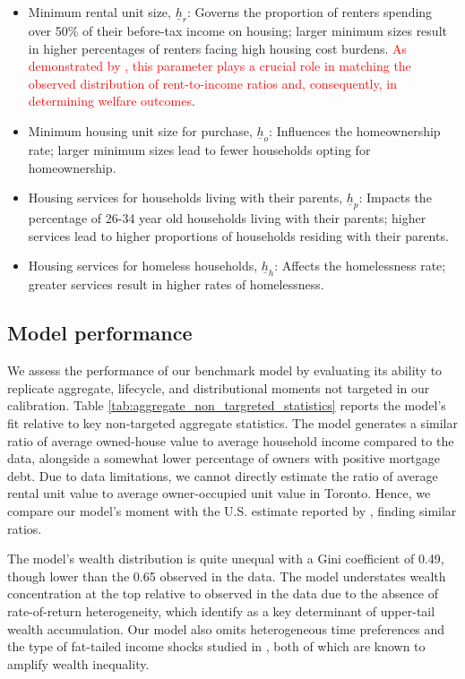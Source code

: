 \documentclass[parskip=full]{article}
\begin{document}
\begin{itemize}
    \item Minimum rental unit size, $\underline{h}_{r}$: Governs the proportion of renters spending over 50\% of their before-tax income on housing; larger minimum sizes result in higher percentages of renters facing high housing cost burdens. \textcolor{red}{As demonstrated by \citet{rs-2023}, this parameter plays a crucial role in matching the observed distribution of rent-to-income ratios and, consequently, in determining welfare outcomes}.
    \item Minimum housing unit size for purchase, $\underline{h}_{o}$: Influences the homeownership rate; larger minimum sizes lead to fewer households opting for homeownership.
    \item Housing services for households living with their parents, $\underline{h}_{p}$: Impacts the percentage of 26-34 year old households living with their parents; higher services lead to higher proportions of households residing with their parents.
    \item Housing services for homeless households, $\underline{h}_{h}$: Affects the homelessness rate; greater services result in higher rates of homelessness.
\end{itemize}

\subsection{Model performance}\label{subsection:non_targeted_statistics}

We assess the performance of our benchmark model by evaluating its ability to replicate aggregate, lifecycle, and distributional moments not targeted in our calibration. Table \ref{tab:aggregate_non_targreted_statistics} reports the model's fit relative to key non-targeted aggregate statistics. The model generates a similar ratio of average owned-house value to average household income compared to the data, alongside a somewhat lower percentage of owners with positive mortgage debt. Due to data limitations, we cannot directly estimate the ratio of average rental unit value to average owner-occupied unit value in Toronto. Hence, we compare our model's moment with the U.S. estimate reported by \citet{chatterjee-eyigungor-2015}, finding similar ratios.

The model's wealth distribution is quite unequal with a Gini coefficient of 0.49, though lower than the 0.65 observed in the data. The model understates wealth concentration at the top relative to observed in the data due to the absence of rate-of-return heterogeneity, which \citet{fagereng} identify as a key determinant of upper-tail wealth accumulation. Our model also omits heterogeneous time preferences \citep{ks-1998} and the type of fat-tailed income shocks studied in \citet{mj-shocks}, both of which are known to amplify wealth inequality.
\end{document}
